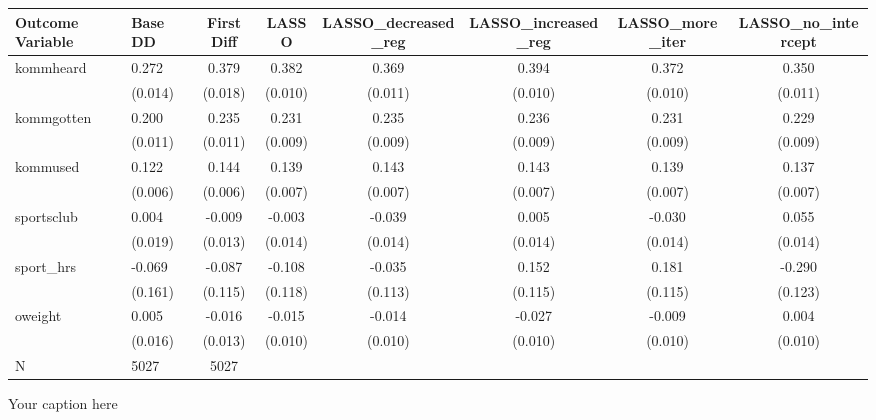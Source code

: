 \begin{adjustbox}{angle=90}
\begin{tabular}{llcccccc}
\hline
Outcome Variable & Base DD & First Diff & LASSO & LASSO_decreased_reg & LASSO_increased_reg & LASSO_more_iter & LASSO_no_intercept \\
\hline
kommheard & 0.272 & 0.379 & 0.382 & 0.369 & 0.394 & 0.372 & 0.350 \\
  & (0.014) & (0.018) & (0.010) & (0.011) & (0.010) & (0.010) & (0.011) \\
kommgotten & 0.200 & 0.235 & 0.231 & 0.235 & 0.236 & 0.231 & 0.229 \\
  & (0.011) & (0.011) & (0.009) & (0.009) & (0.009) & (0.009) & (0.009) \\
kommused & 0.122 & 0.144 & 0.139 & 0.143 & 0.143 & 0.139 & 0.137 \\
  & (0.006) & (0.006) & (0.007) & (0.007) & (0.007) & (0.007) & (0.007) \\
sportsclub & 0.004 & -0.009 & -0.003 & -0.039 & 0.005 & -0.030 & 0.055 \\
  & (0.019) & (0.013) & (0.014) & (0.014) & (0.014) & (0.014) & (0.014) \\
sport_hrs & -0.069 & -0.087 & -0.108 & -0.035 & 0.152 & 0.181 & -0.290 \\
  & (0.161) & (0.115) & (0.118) & (0.113) & (0.115) & (0.115) & (0.123) \\
oweight & 0.005 & -0.016 & -0.015 & -0.014 & -0.027 & -0.009 & 0.004 \\
  & (0.016) & (0.013) & (0.010) & (0.010) & (0.010) & (0.010) & (0.010) \\
\hline
N & 5027 & 5027  &  &  &  &  \\
\hline
\end{tabular}
\caption{Your caption here}
\label{tab:your_label}
\end{adjustbox}